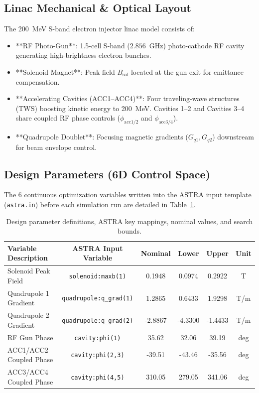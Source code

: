 \documentclass[11pt,a4paper]{article}
\begin{document}
\subsection{Linac Mechanical \& Optical Layout}
The 200~MeV S-band electron injector linac model consists of:
\begin{itemize}
    \item **RF Photo-Gun**: 1.5-cell S-band ($2.856$~GHz) photo-cathode RF cavity generating high-brightness electron bunches.
    \item **Solenoid Magnet**: Peak field $B_{\text{sol}}$ located at the gun exit for emittance compensation.
    \item **Accelerating Cavities (ACC1--ACC4)**: Four traveling-wave structures (TWS) boosting kinetic energy to 200~MeV. Cavities 1--2 and Cavities 3--4 share coupled RF phase controls ($\phi_{\text{acc1/2}}$ and $\phi_{\text{acc3/4}}$).
    \item **Quadrupole Doublet**: Focusing magnetic gradients ($G_{q1}, G_{q2}$) downstream for beam envelope control.
\end{itemize}

\subsection{Design Parameters (6D Control Space)}
The 6 continuous optimization variables written into the ASTRA input template (\texttt{astra.in}) before each simulation run are detailed in Table~\ref{tab:design_variables}.

\begin{table}[H]
\centering
\caption{Design parameter definitions, ASTRA key mappings, nominal values, and search bounds.}
\label{tab:design_variables}
\begin{tabular}{lccccc}
\toprule
\textbf{Variable Description} & \textbf{ASTRA Input Variable} & \textbf{Nominal} & \textbf{Lower} & \textbf{Upper} & \textbf{Unit} \\
\midrule
Solenoid Peak Field & \texttt{solenoid:maxb(1)} & 0.1948 & 0.0974 & 0.2922 & T \\
Quadrupole 1 Gradient & \texttt{quadrupole:q\_grad(1)} & 1.2865 & 0.6433 & 1.9298 & T/m \\
Quadrupole 2 Gradient & \texttt{quadrupole:q\_grad(2)} & -2.8867 & -4.3300 & -1.4433 & T/m \\
RF Gun Phase & \texttt{cavity:phi(1)} & 35.62 & 32.06 & 39.19 & deg \\
ACC1/ACC2 Coupled Phase & \texttt{cavity:phi(2,3)} & -39.51 & -43.46 & -35.56 & deg \\
ACC3/ACC4 Coupled Phase & \texttt{cavity:phi(4,5)} & 310.05 & 279.05 & 341.06 & deg \\
\bottomrule
\end{tabular}
\end{table}
\end{document}
